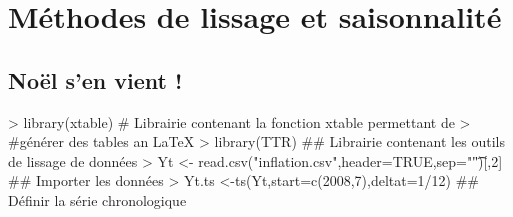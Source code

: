 \documentclass{article}
\begin{document}


\section{Méthodes de lissage et saisonnalité}
\label{sec:serie-dexercices-1}

\subsection{Noël s'en vient !}
\label{sec:exercice-1-1}

\begin{Schunk}
\begin{Sinput}
> library(xtable) # Librairie contenant la fonction xtable permettant de 
>                                         #générer des tables an LaTeX
> library(TTR) ## Librairie contenant les outils de lissage de données
> Yt <- read.csv("inflation.csv",header=TRUE,sep="\t")[,2] ## Importer les données
> Yt.ts <-ts(Yt,start=c(2008,7),deltat=1/12) ## Définir la série chronologique
\end{Sinput}
\end{Schunk}
\end{document}
